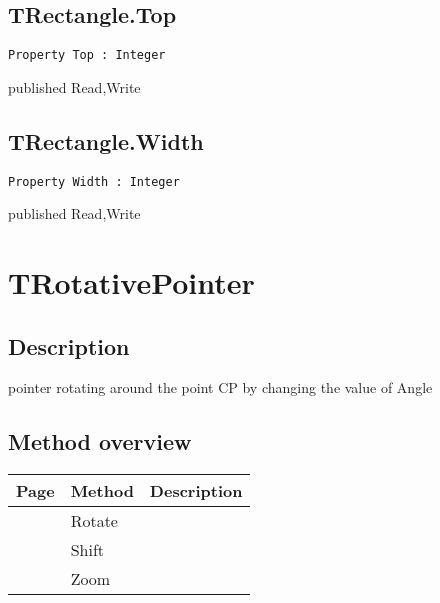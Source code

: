 \subsection{TRectangle.Top}
\label{hmi:drawncontrol:trectangle:top}
\begin{FPCList}
\Declaration 

\begin{verbatim}
Property Top : Integer
\end{verbatim}
\Visibility
published
\Access
Read,Write
\end{FPCList}
\subsection{TRectangle.Width}
\label{hmi:drawncontrol:trectangle:width}
\begin{FPCList}
\Declaration 

\begin{verbatim}
Property Width : Integer
\end{verbatim}
\Visibility
published
\Access
Read,Write
\end{FPCList}
\section{TRotativePointer}
\label{hmi:drawncontrol:trotativepointer}
\subsection{Description}
pointer rotating around the point CP by changing the value of Angle%
\subsection{Method overview}
\label{hmi:drawncontrol:trotativepointer:methods}
\begin{tabularx}{\textwidth}{llX}
Page & Method & Description  \\ \hline
\pageref{hmi:drawncontrol:trotativepointer:rotate} & Rotate  &  \\
\pageref{hmi:drawncontrol:trotativepointer:shift} & Shift  &  \\
\pageref{hmi:drawncontrol:trotativepointer:zoom} & Zoom  &  \\
\hline
\end{tabularx}
